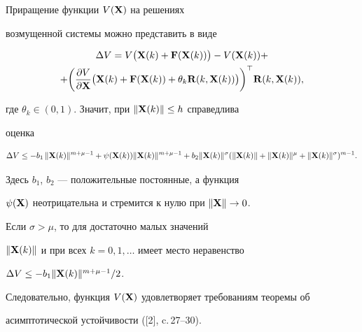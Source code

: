 \begin{pf}


Приращение функции $V(\bold X)$ на решениях


возмущенной системы можно представить в виде


\begin{multline}


\Delta V=V\big(\bold X(k)+\bold F(\bold X(k))\big)


-V(\bold X(k))+ \\


+\bigg(\frac {\partial V}{\partial \bold X}


\big(\bold X(k)+\bold F(\bold X(k))+\theta_k \bold R(k,\bold X(k))\big)


\bigg)^\top \bold R(k,\bold X(k)),


$$


\end{multline}


где $\theta_k\in (0, 1)$. Значит, при $\|\bold X(k)\|\leq h$ справедлива


оценка


$$


\Delta V\leq -b_1\, \|\bold X(k)\|^{m+\mu-1}+\psi(\bold X(k))


\|\bold X(k)\|^{m+\mu-1} +


b_2 \|\bold X(k)\|^{\sigma}(


\|\bold X(k)\|+\|\bold X(k)\|^{\mu}+\|\bold X(k)\|^{\sigma})^{m-1}.


$$


Здесь $b_1$, $b_2$ --- положительные постоянные, а функция


$\psi(\bold X)$ неотрицательна и стремится к нулю при $\|\bold X\|\to 0$.





Если $\sigma>\mu$, то для достаточно малых значений


$\|\bold X(k)\|$ и при всех $k=0,1,\dotsc$ имеет место неравенство


$\Delta V\leq -b_1 \|\bold X(k)\|^{m+\mu-1}/2$.


Следовательно, функция $V(\bold X)$ удовлетворяет требованиям теоремы об


асимптотической устойчивости ([2], c.\,27--30).


\end{pf}





